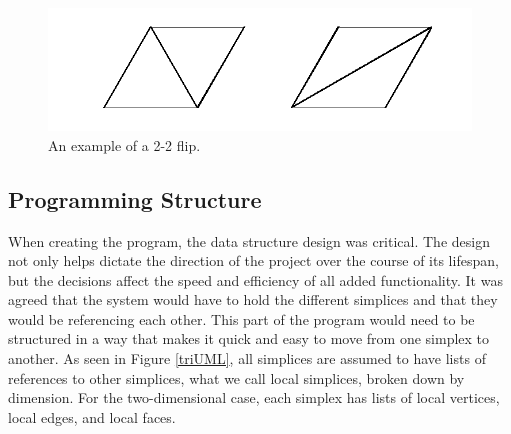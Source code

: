 \documentclass[12pt]{article}
\begin{document}
\begin{figure}
\centering
\includegraphics[scale = 0.8]{Pictures/Flip.png}
\caption{An example of a 2-2 flip.}
\label{fig:flip}
\end{figure}

\subsection{Programming Structure}

\noindent When creating the program, the data structure design was critical. The design not only helps dictate the direction of the project over the course of its lifespan, but the decisions affect the speed and efficiency of all added functionality. It was agreed that the system would have to hold the different simplices and that they would be referencing each other. This part of the program would need to be structured in a way that makes it quick and easy to move from one simplex to another. As seen in Figure \ref{triUML}, all simplices are assumed to have lists of references to other simplices, what we call local simplices, broken down by dimension. For the two-dimensional case, each simplex has lists of local vertices, local edges, and local faces.\newline
\end{document}
